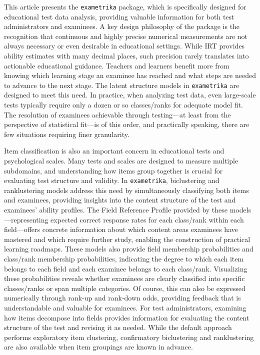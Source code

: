 This article presents the \texttt{exametrika} package, which is specifically designed for educational test data analysis, providing valuable information for both test administrators and examinees. A key design philosophy of the package is the recognition that continuous and highly precise numerical measurements are not always necessary or even desirable in educational settings. While IRT provides ability estimates with many decimal places, such precision rarely translates into actionable educational guidance. Teachers and learners benefit more from knowing which learning stage an examinee has reached and what steps are needed to advance to the next stage. The latent structure models in \texttt{exametrika} are designed to meet this need. In practice, when analyzing test data, even large-scale tests typically require only a dozen or so classes/ranks for adequate model fit. The resolution of examinees achievable through testing---at least from the perspective of statistical fit---is of this order, and practically speaking, there are few situations requiring finer granularity.

Item classification is also an important concern in educational tests and psychological scales. Many tests and scales are designed to measure multiple subdomains, and understanding how items group together is crucial for evaluating test structure and validity. In \texttt{exametrika}, biclustering and ranklustering models address this need by simultaneously classifying both items and examinees, providing insights into the content structure of the test and examinees' ability profiles. The Field Reference Profile provided by these models---representing expected correct response rates for each class/rank within each field---offers concrete information about which content areas examinees have mastered and which require further study, enabling the construction of practical learning roadmaps. These models also provide field membership probabilities and class/rank membership probabilities, indicating the degree to which each item belongs to each field and each examinee belongs to each class/rank. Visualizing these probabilities reveals whether examinees are clearly classified into specific classes/ranks or span multiple categories. Of course, this can also be expressed numerically through rank-up and rank-down odds, providing feedback that is understandable and valuable for examinees. For test administrators, examining how items decompose into fields provides information for evaluating the content structure of the test and revising it as needed. While the default approach performs exploratory item clustering, confirmatory biclustering and ranklustering are also available when item groupings are known in advance.

